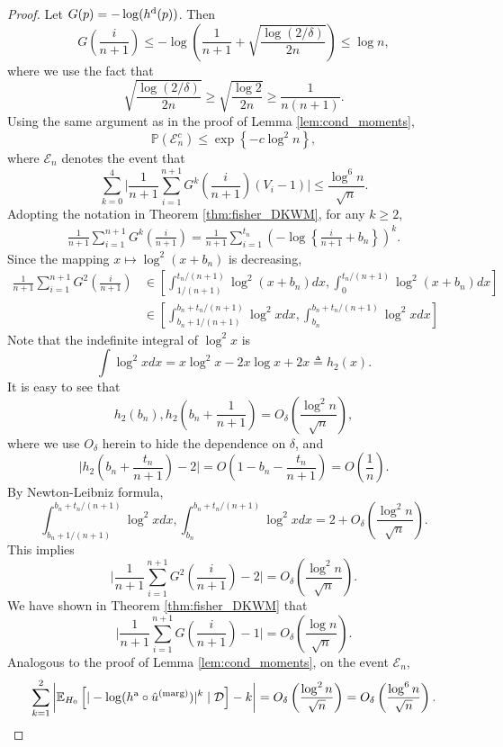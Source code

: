 \documentclass[11pt]{article}
\def\E{\mathbb{E}}
\def\marg{\textnormal{(marg)}}
\def\dkwm{\textnormal{d}}
\def\asym{\textnormal{a}}
\renewcommand{\P}{\mathbb{P}}
\newcommand{\D}{\mathcal{D}}
\newcommand{\event}{\mathcal{E}}
\newcommand{\lb}{\left(}
\newcommand{\rb}{\right)}
\begin{document}
\begin{proof}
  Let $G(p) = -\log (h^\dkwm(p))$. Then
  \begin{equation}
    \label{eq:G_upper_dkwm}
    G\lb\frac{i}{n+1}\rb\le -\log\lb \frac{1}{n+1} + \sqrt{\frac{\log(2/ \delta)}{2n}}\rb\le \log n,
  \end{equation}
  where we use the fact that
  \[\sqrt{\frac{\log(2/ \delta)}{2n}}\ge \sqrt{\frac{\log 2}{2n}}\ge \frac{1}{n(n+1)}.\]
  Using the same argument as in the proof of Lemma \ref{lem:cond_moments},
  \[\P\lb \event_n^c\rb \le \exp \left\{-c\log^2 n\right\},\]
  where $\event_n$ denotes the event that
  \[\sum_{k=0}^{4}\bigg|\frac{1}{n+1}\sum_{i=1}^{n+1}G^k\left(\frac{i}{n+1}\right)(V_{i} - 1)\bigg|\le \frac{\log^6 n}{\sqrt{n}}.\] 
Adopting the notation in Theorem \ref{thm:fisher_DKWM}, for any $k \ge 2$,
  \begin{align*}
    \frac{1}{n+1}\sum_{i=1}^{n+1}G^k\left(\frac{i}{n+1}\right) = \frac{1}{n+1}\sum_{i=1}^{t_n} \lb -\log \left\{\frac{i}{n+1} + b_n\right\}\rb^{k}.
  \end{align*}
  Since the mapping $x\mapsto \log^2(x + b_n)$ is decreasing,
  \begin{align*}
    \frac{1}{n+1}\sum_{i=1}^{n+1}G^2\left(\frac{i}{n+1}\right)&\in \left[\int_{1/(n + 1)}^{t_n / (n + 1)}\log^2 (x + b_n)dx, \int_{0}^{t_n / (n + 1)}\log^2 (x + b_n)dx\right]\\
                                                              & \in \left[\int_{b_n + 1/(n + 1)}^{b_n + t_n / (n + 1)}\log^2 xdx, \int_{b_n}^{b_n + t_n / (n + 1)}\log^2 xdx\right]
  \end{align*}
  Note that the indefinite integral of $\log^2 x$ is 
  \[\int \log^2 xdx = x\log^2 x - 2x\log x + 2x \triangleq h_2(x).\]
  It is easy to see that
  \[h_2\lb b_n\rb, h_2\lb b_n + \frac{1}{n+1}\rb = O_{\delta}\lb\frac{\log^2 n}{\sqrt{n}}\rb,\]
  where we use $O_{\delta}$ herein to hide the dependence on $\delta$, and
  \[\bigg|h_2\lb b_n + \frac{t_n}{n+1}\rb - 2\bigg| = O\lb 1 - b_n - \frac{t_n}{n+1}\rb = O\lb\frac{1}{n}\rb.\]
  By Newton-Leibniz formula,
  \[\int_{b_n+1/(n+1)}^{b_n + t_n / (n + 1)}\log^2 xdx, \int_{b_n}^{b_n + t_n / (n + 1)}\log^2 xdx = 2 + O_{\delta}\lb\frac{\log^2 n}{\sqrt{n}}\rb.\]
  This implies
  \[\bigg|\frac{1}{n+1}\sum_{i=1}^{n+1}G^2\left(\frac{i}{n+1}\right) - 2 \bigg| = O_{\delta}\lb\frac{\log^2 n}{\sqrt{n}}\rb.\]
  We have shown in Theorem \ref{thm:fisher_DKWM} that
  \[\bigg|\frac{1}{n+1}\sum_{i=1}^{n+1}G\left(\frac{i}{n+1}\right) - 1 \bigg| = O_{\delta}\lb\frac{\log n}{\sqrt{n}}\rb.\]
  Analogous to the proof of Lemma \ref{lem:cond_moments}, on the event $\event_{n}$, 
  \[\sum_{k=1}^{2}\bigg|\E_{H_0}\left[|-\log (h^\asym \circ \hat{u}^\marg)|^k\mid \D\right] - k\bigg| = O_{\delta}\lb\frac{\log^2 n}{\sqrt{n}}\rb = O_{\delta}\lb\frac{\log^6 n}{\sqrt{n}}\rb.\]
  

\end{proof}
\end{document}
